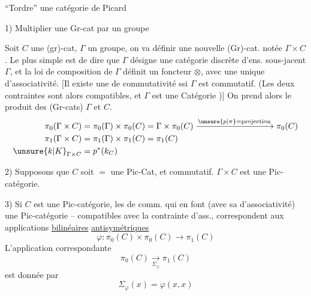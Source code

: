 ``Tordre'' une catégorie de Picard

1) Multiplier une Gr-cat par un groupe

Soit $C$ une (gr)-cat, $\Gamma$ un groupe, on va définir une nouvelle (Gr)-cat. notée $\Gamma\times C$. Le plus simple est de dire que $\Gamma$ désigne une catégorie discrète d'ens. sous-jacent $\Gamma$, et la loi de composition de $\Gamma$ définit un foncteur $\otimes$, avec une unique  d'associativité.  [Il existe une  de commutativité ssi $\Gamma$ est commutatif. (Les deux contraintes sont alors compatibles, et $\Gamma$ est une Catégorie )] On prend alors le produit des (Gr-cats) $\Gamma$ et $C$.
\[
\begin{aligned}
\pi_0(\Gamma\times C)&=\pi_0(\Gamma)\times\pi_0(C)=\Gamma\times\pi_0(C)\xrightarrow{\unsure{p|\pi}=\text{projection}}\pi_0(C)\\
\pi_1(\Gamma\times C)&=\pi_1(\Gamma)\times\pi_1(C)=\pi_1(C)\\
\unsure{k|K}_{\Gamma\times C}&=p^*(k_C)
\end{aligned}
\]

2) Supposons que $C$ soit $=$ une Pic-Cat, et \inserted{$\Gamma$} commutatif.  $\Gamma\times C$ est une Pic-catégorie.

3) Si $C$ est une Pic-catégorie, les   de comm. qui en font (avec sa  d'associativité) une Pic-catégorie --   compatibles avec la contrainte d'ass., correspondent aux applications \uline{bilinéaires} \uline{antisymétriques}
\[
\varphi\colon\pi_0(C)\times\pi_0(C)\longrightarrow\pi_1(C)
\]
L'application correspondante
\[
\pi_0(C)\xrightarrow[\Sigma_\varphi]{}\pi_1(C)
\]
est donnée par
\[
\Sigma_\varphi(x)=\varphi(x,x)
\]
